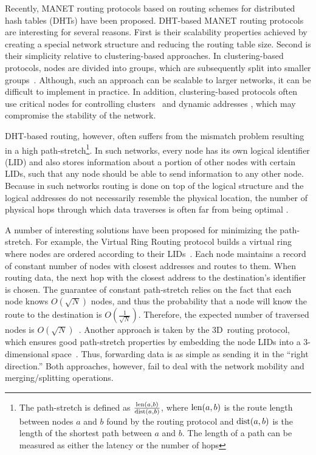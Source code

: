 \documentclass[conference]{IEEEtran}
\theoremstyle{definition}
\begin{document}
Recently, MANET routing protocols based on routing schemes for distributed hash tables (DHTs) have been proposed.  DHT-based MANET routing protocols  are interesting for several reasons. First is their scalability properties achieved by creating a special network structure and reducing the routing table size. Second is their simplicity relative to clustering-based approaches. In clustering-based protocols, nodes are divided into groups, which are subsequently split into smaller groups~\cite{Hong}. Although, such an approach can be scalable to larger networks, it can be difficult to implement in practice. In addition, clustering-based protocols often use critical nodes for controlling clusters~\cite{Hong} and dynamic addresses \cite{Hong,dart,ntk}, which may compromise the stability of the network.

DHT-based routing, however, often suffers from the mismatch problem resulting in a high path-stretch\footnote{The path-stretch is defined as $ \frac{{\rm len}(a,b)}{{\rm dist}(a,b)} $, where ${\rm len}(a,b)$ is the route length between nodes $a$ and $b$ found by the routing protocol and ${\rm dist}(a,b)$ is the length of the shortest path between $a$ and $b$. The length of a path can be measured as either the latency or the number of hops}. In such networks, every node has its own logical identifier (LID) and also stores information about a portion of other nodes with certain LIDs, such that any node should be able to send information to any other node. Because in such networks routing is done on top of the logical structure and the logical addresses do not necessarily resemble the physical location, the number of physical hops through which data traverses is often far from being optimal \cite{Abid}.

A number of interesting solutions have been proposed for minimizing the path-stretch. For example, the Virtual Ring Routing protocol builds a virtual ring where nodes are ordered according to their LIDs~\cite{VRR}. Each node maintains a record of constant number of nodes with closest addresses and routes to them. When routing data, the next hop with the closest address to the destination's identifier is chosen. The guarantee of constant path-stretch relies on the fact that each node knows $O(\sqrt{N})$ nodes, and thus the probability that a node will know the route to the destination is $O(\frac{1}{\sqrt{N}})$. Therefore, the expected number of traversed nodes is $O(\sqrt{N})$~\cite{VRR}. Another approach is taken by the 3D~routing protocol, which ensures good path-stretch properties by embedding the node LIDs into a 3-dimensional space~\cite{3drp}. Thus, forwarding data is as simple as sending it in the ``right direction.'' Both approaches, however, fail to deal with the network mobility and merging/splitting operations. 
\end{document}
